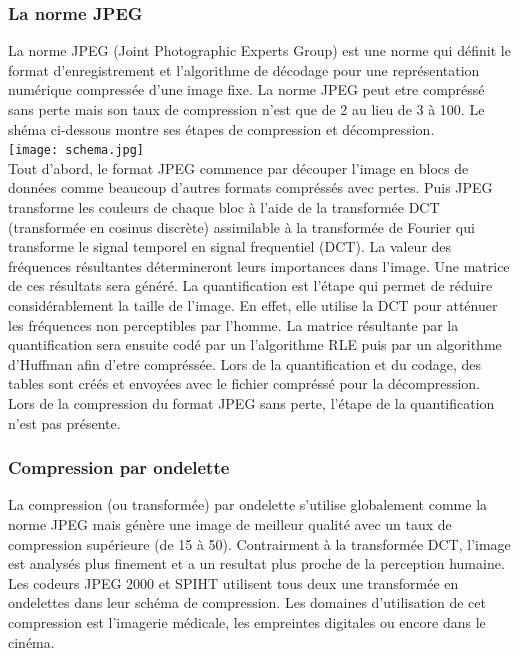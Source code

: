 \documentclass[a4paper]{report}
\begin{document}
	\subsubsection{La norme JPEG}
		La norme JPEG (Joint Photographic Experts Group) est une norme qui définit le format d'enregistrement et l'algorithme de décodage pour une représentation numérique compressée d'une image fixe. La norme JPEG peut etre compréssé sans perte mais son taux de compression n'est que de 2 au lieu de 3 à 100.
Le shéma ci-dessous montre ses étapes de compression et décompression.\\
		\texttt{[image: schema.jpg]} \\
		Tout d'abord, le format JPEG commence par découper l'image en blocs de données comme beaucoup d'autres formats compréssés avec pertes. Puis JPEG transforme les couleurs de chaque bloc à l'aide de la transformée DCT (transformée en cosinus discrète) assimilable à la transformée de Fourier qui transforme le signal temporel en signal frequentiel (DCT). La valeur des fréquences résultantes détermineront leurs importances dans l'image. Une matrice de ces résultats sera généré. La quantification est l'étape qui permet de réduire considérablement la taille de l'image. En effet, elle utilise la DCT pour atténuer les fréquences non perceptibles par l'homme. La matrice résultante par la quantification sera ensuite codé par un l'algorithme RLE puis par un algorithme d'Huffman afin d'etre compréssée. Lors de la quantification et du codage, des tables sont créés et envoyées avec le fichier compréssé pour la décompression.\\
	Lors de la compression du format JPEG sans perte, l'étape de la quantification n'est pas présente.

	\subsubsection{Compression par ondelette}
		La compression (ou transformée) par ondelette s'utilise globalement comme la norme JPEG mais génère une image de meilleur qualité avec un taux de compression supérieure (de 15 à 50). Contrairment à la transformée DCT, l'image est analysés plus finement et a un resultat plus proche de la perception humaine. Les codeurs JPEG 2000 et SPIHT utilisent tous deux une transformée en ondelettes dans leur schéma de compression. Les domaines d'utilisation de cet compression est l'imagerie médicale, les empreintes digitales ou encore dans le cinéma.
\end{document}
